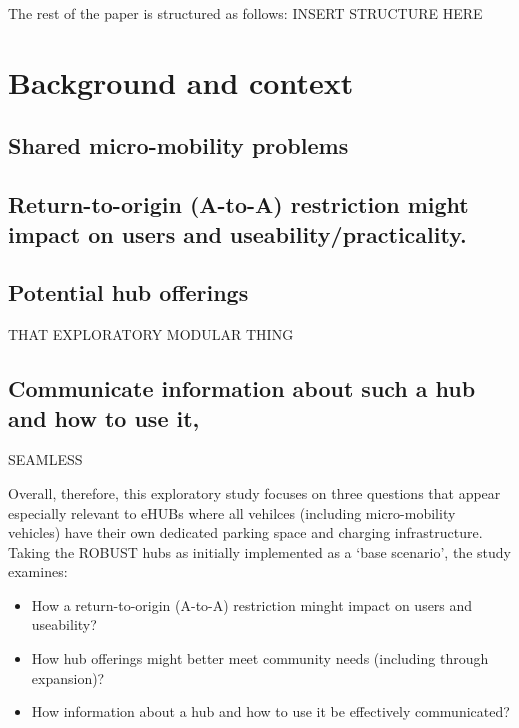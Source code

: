 \documentclass[preprint, 3p,
authoryear]{elsarticle} %
\providecommand{\tightlist}{%
  \setlength{\itemsep}{0pt}\setlength{\parskip}{0pt}}
\begin{document}
The rest of the paper is structured as follows: INSERT STRUCTURE HERE

\section{Background and context}\label{background-and-context}

\subsection{Shared micro-mobility
problems}\label{shared-micro-mobility-problems}

\subsection{Return-to-origin (A-to-A) restriction might impact on users
and
useability/practicality.}\label{return-to-origin-a-to-a-restriction-might-impact-on-users-and-useabilitypracticality.}

\subsection{Potential hub offerings}\label{potential-hub-offerings}

THAT EXPLORATORY MODULAR THING

\subsection{Communicate information about such a hub and how to use
it,}\label{communicate-information-about-such-a-hub-and-how-to-use-it}

SEAMLESS

Overall, therefore, this exploratory study focuses on three questions
that appear especially relevant to eHUBs where all vehilces (including
micro-mobility vehicles) have their own dedicated parking space and
charging infrastructure. Taking the ROBUST hubs as initially implemented
as a `base scenario', the study examines:

\begin{itemize}
\tightlist
\item
  How a return-to-origin (A-to-A) restriction minght impact on users and
  useability?
\item
  How hub offerings might better meet community needs (including through
  expansion)?
\item
  How information about a hub and how to use it be effectively
  communicated?
\end{itemize}
\end{document}
